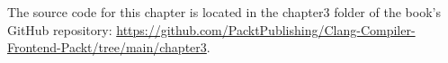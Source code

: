 The source code for this chapter is located in the chapter3 folder of the book's GitHub repository: \url{https://github.com/PacktPublishing/Clang-Compiler-Frontend-Packt/tree/main/chapter3}.
